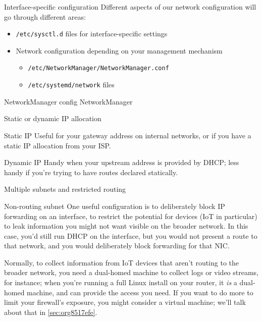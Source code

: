 \documentclass[bigger]{beamer}
\begin{document}
\begin{frame}{Interface-specific configuration}
  Different aspects of our network configuration will go through different areas:
  \begin{itemize}
  \item<2-> \texttt{/etc/sysctl.d} files for interface-specific settings
  \item<3-> Network configuration depending on your management mechanism
    \begin{itemize}
    \item<4-> \texttt{/etc/NetworkManager/NetworkManager.conf}
    \item<5-> \texttt{/etc/systemd/network} files
    \end{itemize}
  \end{itemize}
\end{frame}


\begin{frame}{NetworkManager config}
  NetworkManager 

\begin{block}{Static or dynamic IP allocation}
\begin{block}{Static IP}
Useful for your gateway address on internal networks, or if you have a
static IP allocation from your ISP.
\end{block}

\begin{block}{Dynamic IP}
Handy when your upstream address is provided by DHCP; less handy if you're
trying to have routes declared statically.
\end{block}
\end{block}
\end{frame}

\begin{frame}[label={sec:org3a006ff}]{Multiple subnets and restricted routing}
\begin{block}{Non-routing subnet}
One useful configuration is to deliberately block IP forwarding on an
interface, to restrict the potential for devices (IoT in particular) to
leak information you might not want visible on the broader network. In this
case, you'd still run DHCP on the interface, but you would not present a
route to that network, and you would deliberately block forwarding for that
NIC.

Normally, to collect information from IoT devices that aren't routing to
the broader network, you need a dual-homed machine to collect logs or video
streams, for instance; when you're running a full Linux install on your
router, it \emph{is} a dual-homed machine, and can provide the access you
need. If you want to do more to limit your firewall's exposure, you might
consider a virtual machine; we'll talk about that in \ref{sec:org8517efe}.
\end{block}
\end{frame}
\end{document}
